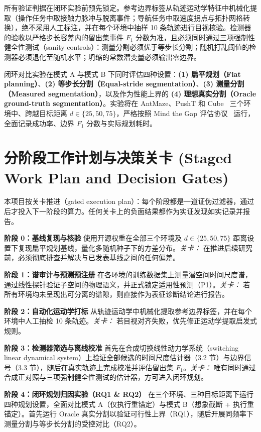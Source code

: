 \documentclass[11pt]{article}
\begin{document}
所有验证判据在闭环实验前预先锁定。参考边界标签从轨迹运动学特征中机械化提取（操作任务中取接触力脉冲与脱离事件；导航任务中取速度拐点与拓扑网格转换），绝不采用人工标注，并在每个环境中抽样 10 条轨迹进行目视核验。检测器的验收以严格步长容差内的留出集事件 $F_1$ 分数为准，且必须同时通过三项强制性健全性测试（sanity controls）：测量分割必须优于等步长分割；随机打乱阈值的检测器必须退化至随机水平；坍缩的常数潜变量必须输出零边界。

闭环对比实验在模式 A 与模式 B 下同时评估四种设置：\textbf{(1) 扁平规划（Flat planning）}、\textbf{(2) 等步长分割（Equal-stride segmentation）}、\textbf{(3) 测量分割（Measured segmentation）}，以及作为性能上界的 \textbf{(4) 理想真实分割（Oracle ground-truth segmentation）}。实验将在 AntMaze、PushT 和 Cube~\cite{hjepa2026} 三个环境中、跨越目标距离 $d \in \{25, 50, 75\}$，严格按照 Mind the Gap 评估协议~\cite{mindthegap2026} 运行，全面记录成功率、边界 $F_1$ 分数与实际规划耗时。

\section{分阶段工作计划与决策关卡 (Staged Work Plan and Decision Gates)}

本项目按关卡推进（gated execution plan）：每个阶段都是一道证伪过滤器，通过后才投入下一阶段的算力。任何关卡上的负面结果都作为实证发现如实记录并报告。

\textbf{阶段 0：基线复现与核验} 使用开源权重在全部三个环境及 $d \in \{25, 50, 75\}$ 距离设置下复现扁平规划基线，量化多随机种子下的方差分布。\textit{关卡：} 在推进后续研究前，必须彻底排查并解决与已发表基线之间的任何偏差。

\textbf{阶段 1：谱审计与预测预注册} 在各环境的训练数据集上测量潜空间时间尺度谱，通过线性探针验证子空间的物理语义，并正式锁定适用性预测（P1）。\textit{关卡：} 若所有环境均未呈现出可分离的谱隙，则直接作为表征诊断结论进行报告。

\textbf{阶段 2：自动化运动学打标} 从轨迹运动学中机械化提取参考边界标签，并在每个环境中人工抽检 10 条轨迹。\textit{关卡：} 若目视对齐失败，优先修正运动学提取启发式规则。

\textbf{阶段 3：检测器筛选与离线校准} 首先在合成切换线性动力学系统（switching linear dynamical system）上验证全部候选的时间尺度估计器（3.2 节）与边界信号（3.3 节），随后在真实轨迹上完成校准并评估留出集 $F_1$。\textit{关卡：} 唯有同时通过合成正对照与三项强制健全性测试的估计器，方可进入闭环规划。

\textbf{阶段 4：闭环规划归因实验（RQ1 \& RQ2）} 在三个环境、三种目标距离下运行四种规划设置，全面对比模式 A（仅执行重锚定）与模式 B（想象截断 + 执行重锚定）。首先运行 Oracle 真实分割以验证可行性上界（RQ1），随后开展同频率下测量分割与等步长分割的受控对比（RQ2）。
\end{document}
